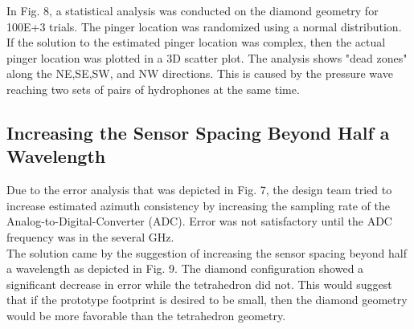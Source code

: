 \documentclass[12pt]{article}
\begin{document}
\noindent In Fig. 8, a statistical analysis was conducted on the diamond geometry for 100E+3 trials. The pinger location was randomized using a normal distribution. If the solution to the estimated pinger location was complex, then the actual pinger location was plotted in a 3D scatter plot. The analysis shows "dead zones" along the NE,SE,SW, and NW directions. This is caused by the pressure wave reaching two sets of pairs of hydrophones at the same time. 

\pagebreak

\subsection{Increasing the Sensor Spacing Beyond Half a Wavelength}

\noindent Due to the error analysis that was depicted in Fig. 7, the design team tried to increase estimated azimuth consistency by increasing the sampling rate of the Analog-to-Digital-Converter (ADC). Error was not satisfactory until the ADC frequency was in the several GHz.\\

\noindent The solution came by the suggestion of increasing the sensor spacing beyond half a wavelength as depicted in Fig. 9. The diamond configuration showed a significant decrease in error while the tetrahedron did not. This would suggest that if the prototype footprint is desired to be small, then the diamond geometry would be more favorable than the tetrahedron geometry. 
\end{document}
